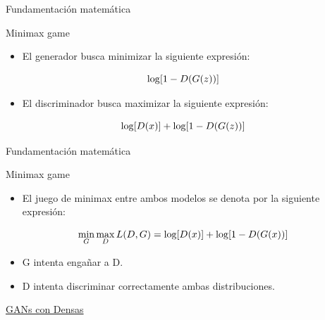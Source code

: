 \begin{frame}{Fundamentación matemática}
    
    \hfill
    \vfill
    {\Large Minimax game}
    \begin{itemize}
        \item El generador busca \alert{minimizar} la siguiente expresión:
    \end{itemize}
    
    \begin{equation}
        \Large \log [1-D(G(z))]
    \end{equation}
    
    \begin{itemize}
        \item El discriminador busca \alert{maximizar} la siguiente expresión:
    \end{itemize}
    
    \begin{equation}
        \Large \log [D(x)]+\log [1-D(G(z))]
    \end{equation}
    
\end{frame}

\begin{frame}{Fundamentación matemática}
    
    \hfill
    \vfill
    {\Large Minimax game}
    \begin{itemize}
        \item El juego de \alert{minimax} entre ambos modelos se denota por la siguiente expresión:
    \end{itemize}
    
    \begin{equation}
        \Large \min _{G} \max _{D} L(D, G)=\log [D(x)]+\log [1-D(G(x))]
    \end{equation}
    
    \begin{itemize}
        \item \alert{G} intenta \alert{engañar} a \alert{D}.
        \item \alert{D} intenta \alert{discriminar} correctamente ambas \alert{distribuciones}.
    \end{itemize}
    
\end{frame}

\begin{exercise}
\href{https://colab.research.google.com/drive/1WF-FahMjwXlpPWHWGg9qESUQhKFxGqJW}{GANs con Densas}
\end{exercise}

